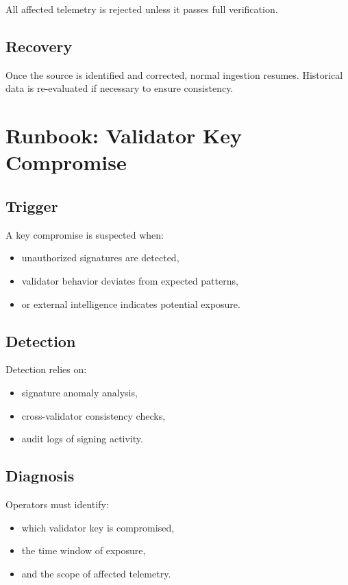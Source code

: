 All affected telemetry is rejected unless it passes full verification.

\subsection{Recovery}

Once the source is identified and corrected, normal ingestion resumes. Historical data is re-evaluated if necessary to ensure consistency.

\section{Runbook: Validator Key Compromise}

\subsection{Trigger}

A key compromise is suspected when:
\begin{itemize}
\item unauthorized signatures are detected,
\item validator behavior deviates from expected patterns,
\item or external intelligence indicates potential exposure.
\end{itemize}

\subsection{Detection}

Detection relies on:
\begin{itemize}
\item signature anomaly analysis,
\item cross-validator consistency checks,
\item audit logs of signing activity.
\end{itemize}

\subsection{Diagnosis}

Operators must identify:
\begin{itemize}
\item which validator key is compromised,
\item the time window of exposure,
\item and the scope of affected telemetry.
\end{itemize}

